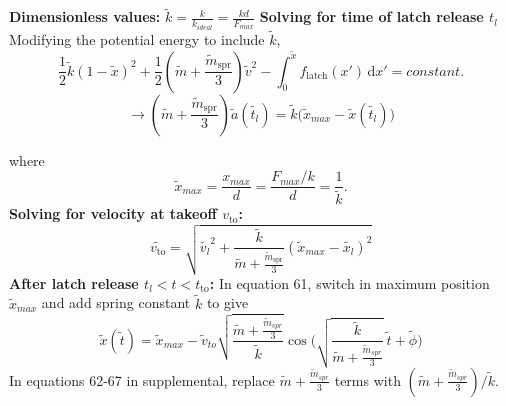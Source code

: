 \documentclass[12pt]{article}
\begin{document}
\noindent \textbf{Dimensionless values:} 
\newline
$\tilde{k} = \frac{k}{k_{ideal}} = \frac{kd}{F_{max}}$
\newline
\newline
\noindent \textbf{Solving for time of latch release $t_l$}
\newline
Modifying the potential energy to include $\tilde{k}$,
\[
    \frac{1}{2}\tilde{k}(1-\tilde{x})^2 + \frac{1}{2}\left(\tilde{m} + \frac{\tilde{m}_{\text{spr}}}{3} \right)\tilde{v}^2 - \int_0^{\tilde{x}} \! f_{\text{latch}}(x') \, \mathrm{d}x' = constant. 
\]
\[
    \rightarrow \left(\tilde{m} + \frac{\tilde{m}_{\text{spr}}}{3} \right)\tilde{a}(\tilde{t_l}) = \tilde{k} \biggl( \tilde{x}_{max} - \tilde{x}(\tilde{t_l}) \biggr)
\]

where 
\[
    \tilde{x}_{max} = \frac{x_{max}}{d} = \frac{F_{max} / k}{d} = \frac{1}{\tilde{k}}.
\]
\newline 
\newline
\noindent \textbf{Solving for velocity at takeoff $v_{\text{to}}$:}
\newline
\[
    \tilde{v_{\text{to}}} = \sqrt{\tilde{v_l}^2 + \frac{\tilde{k}}{\tilde{m} + \frac{\tilde{m}_{\text{spr}}}{3}} (\tilde{x}_{max} - \tilde{x_l})^2}
\]
\newline 
\newline
\noindent \textbf{After latch release $t_l < t < t_{\text{to}}$:}
\newline
In equation 61, switch in maximum position $\tilde{x}_{max}$ and add spring constant $\tilde{k}$ to give
\[
    \tilde{x}(\tilde{t}) = \tilde{x}_{max} - \tilde{v}_{to} \sqrt{\frac{\tilde{m} + \frac{\tilde{m}_{spr}}{3}}{\tilde{k}}} \cos{\biggl(\sqrt{\frac{\tilde{k}}{\tilde{m} + \frac{\tilde{m}_{spr}}{3}}} \ \tilde{t} + \tilde{\phi} \biggr)} \]
In equations 62-67 in supplemental, replace $\tilde{m} + \frac{\tilde{m}_{spr}}{3}$ terms with $(\tilde{m} + \frac{\tilde{m}_{spr}}{3}) / \tilde{k}$.
\newline
\end{document}

